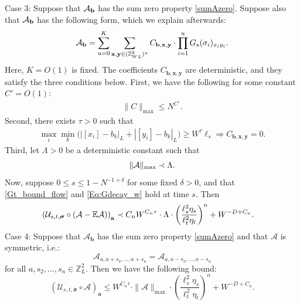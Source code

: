 \begin{lemma}
Case 3: Suppose that ${\cal A}_{\textbf{b}}$ has the sum zero property \eqref{sumAzero}. Suppose also that ${\cal A}_{\textbf{b}}$ has the following form, which we explain afterwards:
%
\begin{align}\label{a-local-form}
{\cal A}_{\textbf{b}}=\sum_{u=0}^{K}\sum_{\textbf{x},\textbf{y}\in(\mathbb{Z}_{WL}^{2})^{u}}C_{\textbf{b},\textbf{x},\textbf{y}}\cdot\prod_{i=1}^{u}G_{s}(\sigma_{i})_{x_{i}y_{i}}.
\end{align}
%
Here, $K=O(1)$ is fixed. The coefficients $C_{\textbf{b},\textbf{x},\textbf{y}}$ are deterministic, and they satisfy the three conditions below. First, we have the following for some constant $C'=O(1)$:
%
\begin{align*}
\|C\|_{\max}\leq N^{C'}.
\end{align*}
%
Second, there exists $\tau>0$ such that 
%
\begin{align*}
\max_{i}\min_{k}\Big(|[x_{i}]-b_{k}|_{L}+|[y_{i}]-b_{k}|_{L}\Big) \geq W^{\tau}\ell_{s} \Rightarrow C_{\textbf{b},\textbf{x},\textbf{y}}=0.
\end{align*}
%
{Third, let $\Lambda>0$ be a deterministic constant such that 
%
\begin{align*}
\|{\cal A}\|_{\max}\prec\Lambda.
\end{align*}
%
}
Now, suppose $0\leq s\leq 1-N^{-1+\delta}$ for some fixed $\delta>0$, and that \eqref{Gt_bound_flow} and \eqref{Eq:Gdecay_w} hold at time $s$. Then
%
\begin{align}\label{sum_res_3}
\left({\cal U}_{s,t,\boldsymbol{\sigma}}\circ({\cal A}-\mathbb{E}{\cal A})\right)_{\textbf{a}}&\prec C_{n}W^{C_{n}\tau}\cdot{\Lambda} \cdot\left(\frac{\ell_{s}^{2}\eta_{s}}{\ell_{t}^{2}\eta_{t}}\right)^{n}+W^{-D+C_{n}}.
\end{align}
%
Case 4: Suppose that $\mathcal{A}_{\textbf{b}}$ has the sum zero property \eqref{sumAzero} and that $\mathcal{A}$ is symmetric, i.e.:
$$
\mathcal{A}_{a, a+s_2,\ldots, a+s_n} = \mathcal{A}_{a, a-s_2,\ldots, a-s_n}
$$
for all $a, s_2, \ldots, s_n \in \mathbb{Z}_L^2$. Then we have the following bound:
\begin{equation}\label{symmetric_tensor}
    \left(\mathcal{U}_{s,t,\boldsymbol{\sigma}} \circ \mathcal{A}\right)_\textbf{a} \le W^{C_n\tau}\cdot   \|\mathcal{A}\|_{\max} 
    \cdot \left(\frac{\ell_s^2\eta_s}{\ell_t^2\eta_t}\right)^{n } +W^{-D+C_n}.
\end{equation}


\end{lemma}
